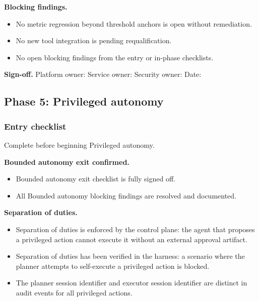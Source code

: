 \documentclass[11pt]{article}
\begin{document}
\textbf{Blocking findings.}
\begin{itemize}
  \item No metric regression beyond threshold anchors is open without remediation.
  \item No new tool integration is pending requalification.
  \item No open blocking findings from the entry or in-phase checklists.
\end{itemize}

\textbf{Sign-off.} Platform owner: \underline{\hspace{1in}} \quad Service owner: \underline{\hspace{1in}} \quad Security owner: \underline{\hspace{1in}} \quad Date: \underline{\hspace{0.7in}}

\subsection{Phase 5: Privileged autonomy}

\subsubsection{Entry checklist}
Complete before beginning Privileged autonomy.

\textbf{Bounded autonomy exit confirmed.}
\begin{itemize}
  \item Bounded autonomy exit checklist is fully signed off.
  \item All Bounded autonomy blocking findings are resolved and documented.
\end{itemize}

\textbf{Separation of duties.}
\begin{itemize}
  \item Separation of duties is enforced by the control plane: the agent that proposes a privileged action cannot execute it without an external approval artifact.
  \item Separation of duties has been verified in the harness: a scenario where the planner attempts to self-execute a privileged action is blocked.
  \item The planner session identifier and executor session identifier are distinct in audit events for all privileged actions.
\end{itemize}
\end{document}
